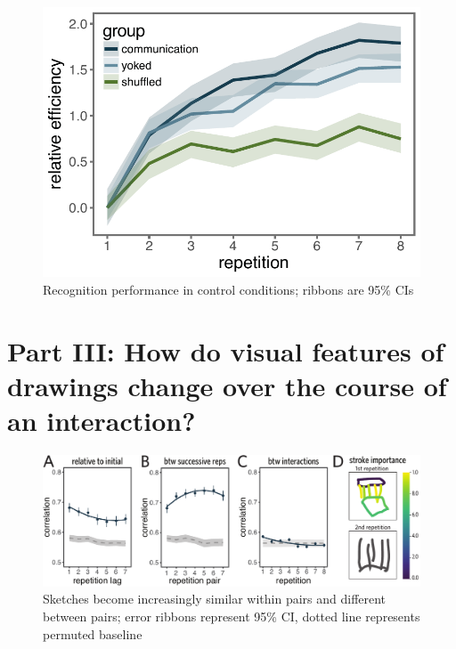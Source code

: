 \documentclass[10pt,letterpaper]{article}
\begin{document}




\begin{figure}
\includegraphics[width=\linewidth]{figures/recog_BIS_timeseries.pdf}
\caption{Recognition performance in control conditions; ribbons are 95\% CIs}
\label{recog_bis}
\end{figure}


\section{Part III: How do visual features of drawings change over the course of an interaction?}

\begin{figure}
\includegraphics[width=0.98\linewidth]{figures/drawing_changes.pdf}
\caption{Sketches become increasingly similar within pairs and different between pairs; error ribbons represent 95\% CI, dotted line represents permuted baseline}
\label{within-across}
\end{figure}
\end{document}
